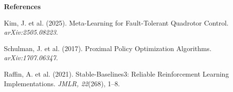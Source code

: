 \documentclass[12pt,letterpaper]{article}
\begin{document}
\vspace{10pt}
\noindent\textbf{References}

\noindent[1] Kim, J. et al. (2025). Meta-Learning for Fault-Tolerant Quadrotor Control. \textit{arXiv:2505.08223}.

\noindent[2] Schulman, J. et al. (2017). Proximal Policy Optimization Algorithms. \textit{arXiv:1707.06347}.

\noindent[3] Raffin, A. et al. (2021). Stable-Baselines3: Reliable Reinforcement Learning Implementations. \textit{JMLR, 22}(268), 1--8.
\end{document}
